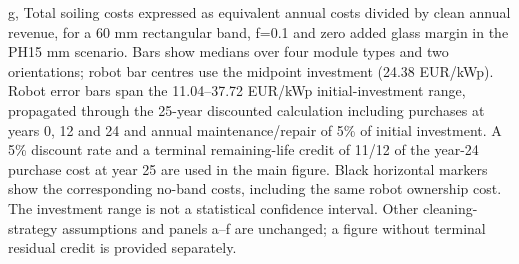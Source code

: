 g, Total soiling costs expressed as equivalent annual costs divided by clean annual revenue, for a 60 mm rectangular band, f=0.1 and zero added glass margin in the PH15 mm scenario. Bars show medians over four module types and two orientations; robot bar centres use the midpoint investment (24.38 EUR/kWp). Robot error bars span the 11.04--37.72 EUR/kWp initial-investment range, propagated through the 25-year discounted calculation including purchases at years 0, 12 and 24 and annual maintenance/repair of 5\% of initial investment. A 5\% discount rate and a terminal remaining-life credit of 11/12 of the year-24 purchase cost at year 25 are used in the main figure. Black horizontal markers show the corresponding no-band costs, including the same robot ownership cost. The investment range is not a statistical confidence interval. Other cleaning-strategy assumptions and panels a--f are unchanged; a figure without terminal residual credit is provided separately.
